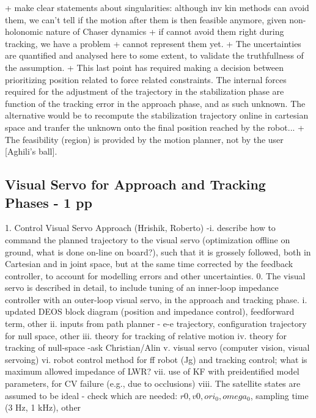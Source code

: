 + make clear statements about singularities: although inv kin methods can avoid them, we can't tell if the motion after them is then feasible anymore, given non-holonomic nature of Chaser dynamics + if cannot avoid them right during tracking, we have a problem + cannot represent them yet.
+ The uncertainties are quantified and analysed here to some extent, to validate the truthfullness of the assumption. 
+ This last point has required making a decision between prioritizing position related to force related constraints. The internal forces required for the adjustment of the trajectory in the stabilization phase are function of the tracking error in the approach phase, and as such unknown. The alternative would be to recompute the stabilization trajectory online in cartesian space and tranfer the unknown onto the final position reached by the robot... 
+ The feasibility (region) is provided by the motion planner, not by the user [Aghili's ball]. 
	
%
\subsection{Visual Servo for Approach and Tracking Phases - 1 pp}
%



1. Control Visual Servo Approach (Hrishik, Roberto)
        -i. describe how to command the planned trajectory to the visual servo (optimization offline on ground, what is done on-line on board?), such that it is grossely followed, both in Cartesian and in joint space, but at the same time corrected by the feedback controller, to account for modelling errors and other uncertainties.
	0. The visual servo is described in detail, to include tuning of an inner-loop impedance controller with an outer-loop visual servo, in the approach and tracking phase.
	i. updated DEOS block diagram (position and impedance control), feedforward term, other
	ii. inputs from path planner - e-e trajectory, configuration trajectory for null space, other
	iii. theory for tracking of relative motion
	iv. theory for tracking of null-space -ask Christian/Alin
	v. visual servo (computer vision, visual servoing)
	vi. robot control method for ff robot (Jg) and tracking control; what is maximum allowed impedance of LWR?
	vii. use of KF with preidentified model parameters, for CV failure (e.g., due to occlusions)
	viii. The satellite states are assumed to be ideal - check which are needed: $r0, v0, ori_0, omega_0$, sampling time (3 Hz, 1 kHz), other
	
